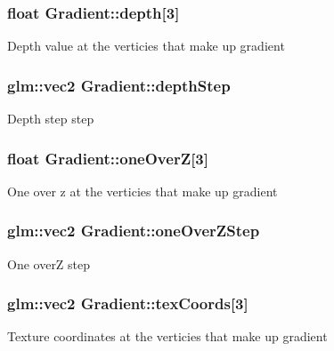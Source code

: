 \subsubsection[{depth}]{\setlength{\rightskip}{0pt plus 5cm}float Gradient\+::depth\mbox{[}3\mbox{]}}\label{class_gradient_ac0077f281e1539333e984574e8f728a3}
Depth value at the verticies that make up gradient \hypertarget{class_gradient_a45a2e551be6a31ce12fdc3c39191914f}{}
\subsubsection[{depth\+Step}]{\setlength{\rightskip}{0pt plus 5cm}glm\+::vec2 Gradient\+::depth\+Step}\label{class_gradient_a45a2e551be6a31ce12fdc3c39191914f}
Depth step step \hypertarget{class_gradient_aab07e150dbcc6550c252b66180ceceb2}{}
\subsubsection[{one\+Over\+Z}]{\setlength{\rightskip}{0pt plus 5cm}float Gradient\+::one\+Over\+Z\mbox{[}3\mbox{]}}\label{class_gradient_aab07e150dbcc6550c252b66180ceceb2}
One over z at the verticies that make up gradient \hypertarget{class_gradient_aa3bc11489f5f615cafc9dc8c8c180145}{}
\subsubsection[{one\+Over\+Z\+Step}]{\setlength{\rightskip}{0pt plus 5cm}glm\+::vec2 Gradient\+::one\+Over\+Z\+Step}\label{class_gradient_aa3bc11489f5f615cafc9dc8c8c180145}
One over\+Z step \hypertarget{class_gradient_ae71837d2a5b35d006054d5d474eddb1a}{}
\subsubsection[{tex\+Coords}]{\setlength{\rightskip}{0pt plus 5cm}glm\+::vec2 Gradient\+::tex\+Coords\mbox{[}3\mbox{]}}\label{class_gradient_ae71837d2a5b35d006054d5d474eddb1a}
Texture coordinates at the verticies that make up gradient \hypertarget{class_gradient_a624a5bc1117ef0ff5586505bd7414b00}{}
